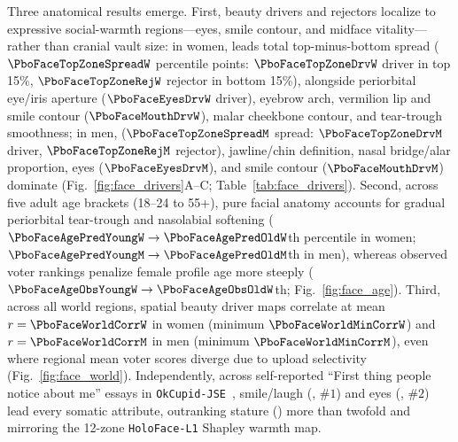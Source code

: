 Three anatomical results emerge. First, beauty drivers and rejectors localize to expressive social-warmth regions---eyes, smile contour, and midface vitality---rather than cranial vault size: in women, \PboFaceTopZoneNameW{} leads total top-minus-bottom spread ($\PboFaceTopZoneSpreadW$ percentile points: $\PboFaceTopZoneDrvW$ driver in top 15\%, $\PboFaceTopZoneRejW$ rejector in bottom 15\%), alongside periorbital eye/iris aperture ($\PboFaceEyesDrvW$ driver), eyebrow arch, vermilion lip and smile contour ($\PboFaceMouthDrvW$), malar cheekbone contour, and tear-trough smoothness; in men, \PboFaceTopZoneNameM{} ($\PboFaceTopZoneSpreadM$ spread: $\PboFaceTopZoneDrvM$ driver, $\PboFaceTopZoneRejM$ rejector), jawline/chin definition, nasal bridge/alar proportion, eyes ($\PboFaceEyesDrvM$), and smile contour ($\PboFaceMouthDrvM$) dominate (Fig.~\ref{fig:face_drivers}A--C; Table~\ref{tab:face_drivers}). Second, across five adult age brackets (18--24 to 55+), pure facial anatomy accounts for gradual periorbital tear-trough and nasolabial softening ($\PboFaceAgePredYoungW\to\PboFaceAgePredOldW$th percentile in women; $\PboFaceAgePredYoungM\to\PboFaceAgePredOldM$th in men), whereas observed voter rankings penalize female profile age more steeply ($\PboFaceAgeObsYoungW\to\PboFaceAgeObsOldW$th; Fig.~\ref{fig:face_age}). Third, across all \PboFaceWorldRegionsN{} world regions, spatial beauty driver maps correlate at mean $r=\PboFaceWorldCorrW$ in women (minimum $\PboFaceWorldMinCorrW$) and $r=\PboFaceWorldCorrM$ in men (minimum $\PboFaceWorldMinCorrM$), even where regional mean voter scores diverge due to upload selectivity (Fig.~\ref{fig:face_world}). Independently, across \PboOkcNoticeN{} self-reported ``First thing people notice about me'' essays in \texttt{OkCupid-JSE}~\cite{kim2015}, smile/laugh (\PboOkcSmilePct{}, $\#1$) and eyes (\PboOkcEyesPct{}, $\#2$) lead every somatic attribute, outranking stature (\PboOkcHeightNoticePct{}) more than twofold and mirroring the 12-zone \texttt{HoloFace-L1} Shapley warmth map.

